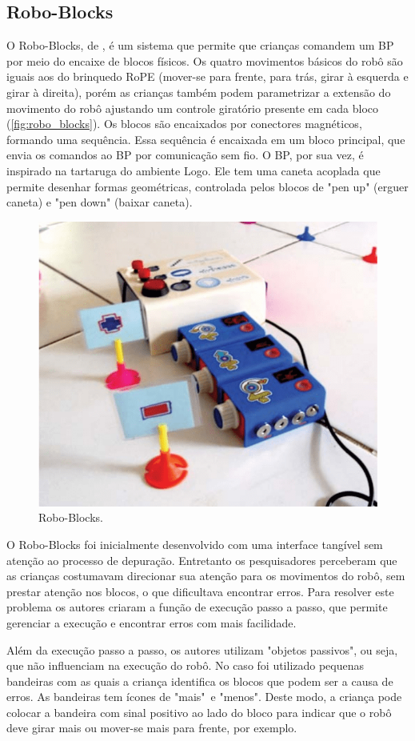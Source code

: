 \subsection{Robo-Blocks}
O Robo-Blocks, de , é um sistema que permite que crianças comandem um BP por meio do encaixe de blocos físicos. Os quatro movimentos básicos do robô são iguais aos do brinquedo RoPE (mover-se para frente, para trás, girar à esquerda e girar à direita), porém as crianças também podem parametrizar a extensão do movimento do robô ajustando um controle giratório presente em cada bloco (\autoref{fig:robo_blocks}). Os blocos são encaixados por conectores magnéticos, formando uma sequência. Essa sequência é encaixada em um bloco principal, que envia os comandos ao BP por comunicação sem fio. O BP, por sua vez, é inspirado na tartaruga do ambiente Logo. Ele tem uma caneta acoplada que permite desenhar formas geométricas, controlada pelos blocos de "pen up" (erguer caneta) e "pen down" (baixar caneta).

\begin{figure}[!h]
    \centering
    \includegraphics[width=.7\linewidth,fbox]{figs/robo_blocks.png}
    \caption{Robo-Blocks.}
    \label{fig:robo_blocks}
\end{figure}
O Robo-Blocks foi inicialmente desenvolvido com uma interface tangível sem atenção ao processo de depuração. Entretanto os pesquisadores perceberam que as crianças costumavam direcionar sua atenção para os movimentos do robô, sem prestar atenção nos blocos, o que dificultava encontrar erros. Para resolver este problema os autores criaram a função de execução passo a passo, que permite gerenciar a execução e encontrar erros com mais facilidade.

Além da execução passo a passo, os autores utilizam "objetos passivos", ou seja, que não influenciam na execução do robô. No caso foi utilizado pequenas bandeiras com as quais a criança identifica os blocos que podem ser a causa de erros. As bandeiras tem ícones de "mais"\ e "menos". Deste modo, a criança pode colocar a bandeira com sinal positivo ao lado do bloco para indicar que o robô deve girar mais ou mover-se mais para frente, por exemplo. 

